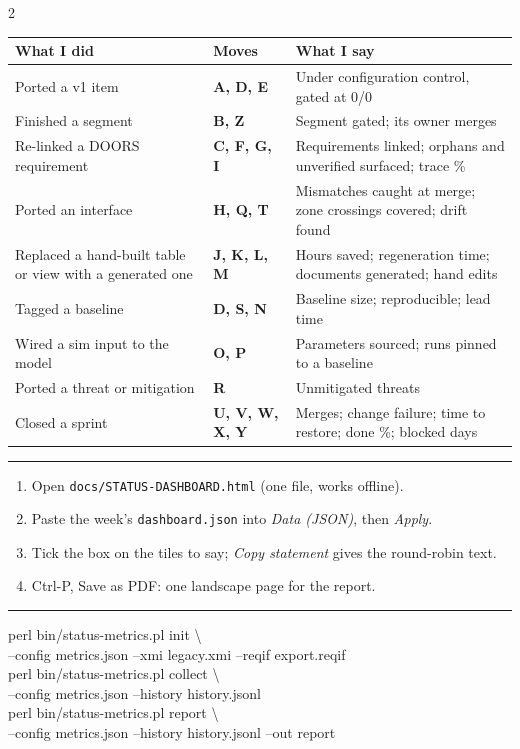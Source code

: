 \documentclass[letterpaper]{article}
\newcommand{\head}[1]{\par\vspace{7pt}{\sffamily\bfseries\large #1}\par\vspace{1pt}\hrule\vspace{4pt}}
\begin{document}
\begin{multicols}{2}
\begin{minipage}{\linewidth}
{\begin{tabularx}{\linewidth}{@{}>{\raggedright\arraybackslash}X >{\sffamily\bfseries}l >{\raggedright\arraybackslash}X@{}}
\toprule
What I did & Moves & What I say\\
\midrule
Ported a v1 item & A, D, E & Under configuration control, gated at 0/0\\
Finished a segment & B, Z & Segment gated; its owner merges\\
Re-linked a DOORS requirement & C, F, G, I & Requirements linked; orphans and unverified surfaced; trace \%\\
Ported an interface & H, Q, T & Mismatches caught at merge; zone crossings covered; drift found\\
Replaced a hand-built table or view with a generated one & J, K, L, M & Hours saved; regeneration time; documents generated; hand edits\\
Tagged a baseline & D, S, N & Baseline size; reproducible; lead time\\
Wired a sim input to the model & O, P & Parameters sourced; runs pinned to a baseline\\
Ported a threat or mitigation & R & Unmitigated threats\\
Closed a sprint & U, V, W, X, Y & Merges; change failure; time to restore; done \%; blocked days\\
\bottomrule
\end{tabularx}}\end{minipage}
\head{The dashboard}
\begin{enumerate}[leftmargin=1.2em,itemsep=1pt,topsep=2pt]
\item Open \texttt{docs/STATUS-DASHBOARD.html} (one file, works offline).
\item Paste the week's \texttt{dashboard.json} into \emph{Data (JSON)}, then \emph{Apply}.
\item Tick the box on the tiles to say; \emph{Copy statement} gives the round-robin text.
\item Ctrl-P, Save as PDF: one landscape page for the report.
\end{enumerate}
\head{Collecting the numbers}
{\footnotesize\ttfamily
perl bin/status-metrics.pl init \textbackslash\\\hspace*{1em}--config metrics.json --xmi legacy.xmi --reqif export.reqif\\[1pt]
perl bin/status-metrics.pl collect \textbackslash\\\hspace*{1em}--config metrics.json --history history.jsonl\\[1pt]
perl bin/status-metrics.pl report \textbackslash\\\hspace*{1em}--config metrics.json --history history.jsonl --out report\par}

\end{multicols}
\end{document}
